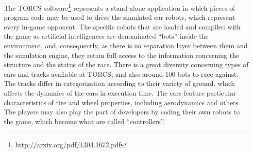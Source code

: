 
The TORCS software\footnote{\url{http://arxiv.org/pdf/1304.1672.pdf}} represents a stand-alone application in which pieces of program code may be used to drive the simulated car robots, which represent every in-game opponent. The specific robots that are loaded and compiled with the game as artificial intelligences are denominated ``bots'' inside the environment, and, consequently, as there is no separation layer between them and the simulation engine, they retain full access to the information concerning the structure and the status of the race. There is a great diversity concerning types of cars and tracks available at TORCS, and also around 100 bots to race against. The tracks differ in categorization according to their variety of ground, which affects the dynamics of the cars in execution time. The cars feature particular characteristics of tire and wheel properties, including aerodynamics and others. The players may also play the part of developers by coding their own robots to the game, which become what are called ``controllers''.





